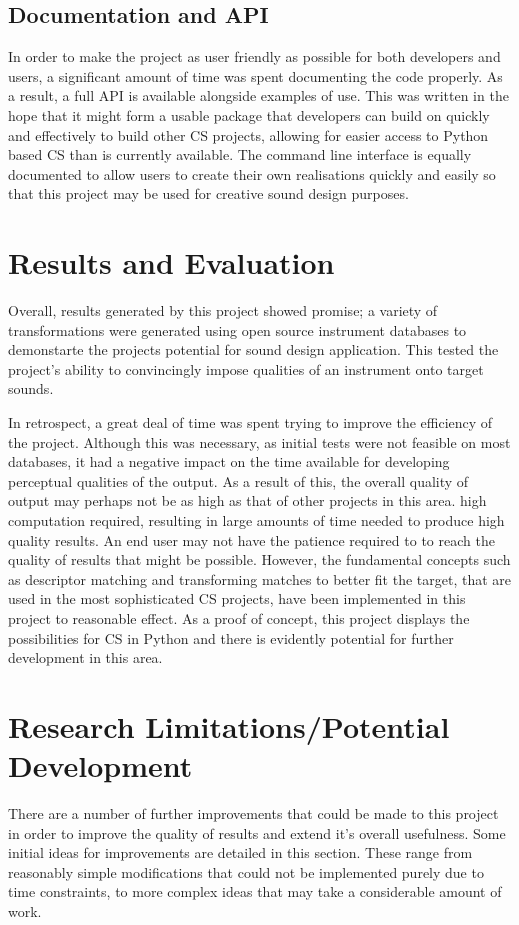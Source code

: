\documentclass{scrartcl}
\begin{document}
    \subsection*{Documentation and API}
    In order to make the project as user friendly as possible for both
    developers and users, a significant amount of time was spent documenting
    the code properly. As a result, a full API is available alongside examples
    of use. This was written in the hope that it might form a usable package
    that developers can build on quickly and effectively to build other CS
    projects, allowing for easier access to Python based CS than is currently
    available. The command line interface is equally documented to allow users
    to create their own realisations quickly and easily so that this project
    may be used for creative sound design purposes.

    \section*{Results and Evaluation}
    Overall, results generated by this project showed promise; a variety of
    transformations were generated using open source instrument databases to
    demonstarte the projects potential for sound design application. This
    tested the project's ability to convincingly impose qualities of an
    instrument onto target sounds. 

    In retrospect, a great deal of time was spent trying to improve the
    efficiency of the project. Although this was necessary, as initial tests
    were not feasible on most databases, it had a negative impact on the time
    available for developing perceptual qualities of the output. As a result of
    this, the overall quality of output may perhaps not be as high as that of
    other projects in this area. 
    high computation required, resulting in
    large amounts of time needed to produce high quality results. An end user
    may not have the patience required to to reach the quality of results that
    might be possible. However, the fundamental concepts such as descriptor
    matching and transforming matches to better fit the target, that are used
    in the most sophisticated CS projects, have been implemented in this
    project to reasonable effect. As a proof of concept, this project displays
    the possibilities for CS in Python and there is evidently potential for
    further development in this area.

    \section*{Research Limitations/Potential Development}
    There are a number of further improvements that could be made to this
    project in order to improve the quality of results and extend it's overall
    usefulness. Some initial ideas for improvements are detailed in this
    section. These range from reasonably simple modifications that could not be
    implemented purely due to time constraints, to more complex ideas that may
    take a considerable amount of work.\\
\end{document}
